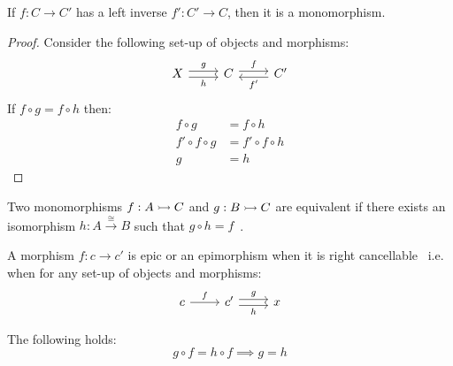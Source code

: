\begin{theorem}\label{thm:right_inverse_implies_mono}

  If $f:C\to C'$ has a left inverse $f':C'\to C$, then it is a monomorphism.

  \begin{proof}
    Consider the following set-up of objects and morphisms:
    \[
      \begin{tikzcd}[ampersand replacement=\&]
        X \& C \& {C'}
        \arrow["f", shift left=1, from=1-2, to=1-3]
        \arrow["g", shift left=1, from=1-1, to=1-2]
        \arrow["h"', shift right=1, from=1-1, to=1-2]
        \arrow["{f'}", shift left=1, from=1-3, to=1-2]
      \end{tikzcd}
    \]
    If $f\circ g = f\circ h$ then:
    \[
      \begin{aligned}
        f\circ g &= f\circ h\\
        f'\circ f \circ g &= f'\circ f\circ h\\
        g &= h
      \end{aligned}
    \]
  \end{proof}
  \vspace{-\baselineskip}
\end{theorem}

\begin{definition}
  Two monomorphisms $f:A\rightarrowtail C$ and $g:B\rightarrowtail C$ are equivalent if there exists
  an isomorphism $h: A \overset{\cong}{\to} B$ such
  that $g\circ h=f$~\parencite{lane_moerdijk:sheaves_geometry_logic}.
\end{definition}

\begin{definition}
  A morphism $f:c\to c'$ is epic or an epimorphism when it is right
  cancellable~\parencite{lane:working_mathematician} i.e. when for any set-up of
  objects and morphisms:
  \[\begin{tikzcd}[ampersand replacement=\&]
    c \& {c'} \& x
    \arrow["h"', shift right=1, from=1-2, to=1-3]
    \arrow["f", from=1-1, to=1-2]
    \arrow["g", shift left=1, from=1-2, to=1-3]
  \end{tikzcd}\]

  The following holds:
  \[g \circ f = h \circ f \implies g = h\]
\end{definition}

